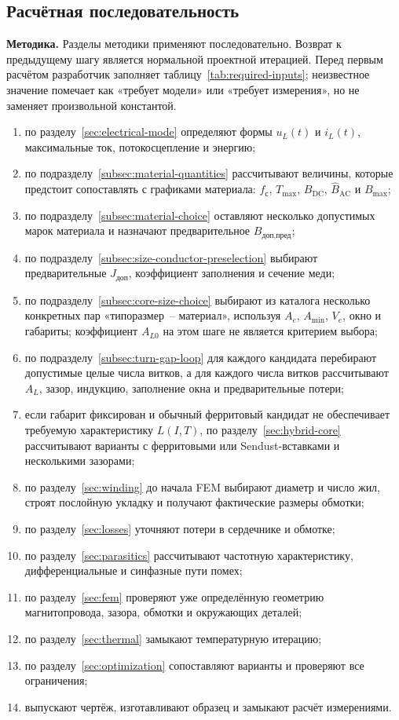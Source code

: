 \documentclass[14pt,a4paper]{extarticle}
\newcommand{\method}{\par\noindent\textbf{Методика.} }
\begin{document}
\subsection{Расчётная последовательность}

\method Разделы методики применяют последовательно. Возврат к предыдущему
шагу является нормальной проектной итерацией. Перед первым расчётом разработчик
заполняет таблицу~\ref{tab:required-inputs}; неизвестное значение помечает как
«требует модели» или «требует измерения», но не заменяет произвольной
константой.

\begin{enumerate}
\item по разделу~\ref{sec:electrical-mode} определяют формы $u_L(t)$ и
$i_L(t)$, максимальные ток, потокосцепление и энергию;
\item по подразделу~\ref{subsec:material-quantities} рассчитывают величины, которые предстоит
сопоставлять с графиками материала: $f_{\text{с}}$, $T_{\max}$,
$B_{\text{DC}}$, $\widehat B_{\text{AC}}$ и $B_{\max}$;
\item по подразделу~\ref{subsec:material-choice} оставляют несколько
допустимых марок материала и назначают предварительное
$B_{\text{доп,пред}}$;
\item по подразделу~\ref{subsec:size-conductor-preselection} выбирают
предварительные $J_{\text{доп}}$, коэффициент заполнения и сечение меди;
\item по подразделу~\ref{subsec:core-size-choice} выбирают из каталога
несколько конкретных пар
«типоразмер~-- материал», используя $A_e$, $A_{\min}$, $V_e$, окно и
габариты; коэффициент $A_{L0}$ на этом шаге не является критерием выбора;
\item по подразделу~\ref{subsec:turn-gap-loop} для каждого кандидата
перебирают допустимые целые
числа витков, а для каждого числа витков рассчитывают $A_L$, зазор,
индукцию, заполнение окна и предварительные потери;
\item если габарит фиксирован и обычный ферритовый кандидат не обеспечивает
требуемую характеристику $L(I,T)$, по разделу~\ref{sec:hybrid-core}
рассчитывают варианты с ферритовыми или Sendust-вставками и несколькими
зазорами;
\item по разделу~\ref{sec:winding} до начала FEM выбирают диаметр и число
жил, строят послойную укладку и получают фактические размеры обмотки;
\item по разделу~\ref{sec:losses} уточняют потери в сердечнике и обмотке;
\item по разделу~\ref{sec:parasitics} рассчитывают частотную характеристику,
дифференциальные и синфазные пути помех;
\item по разделу~\ref{sec:fem} проверяют уже определённую геометрию
магнитопровода, зазора, обмотки и окружающих деталей;
\item по разделу~\ref{sec:thermal} замыкают температурную итерацию;
\item по разделу~\ref{sec:optimization} сопоставляют варианты и проверяют
все ограничения;
\item выпускают чертёж, изготавливают образец и замыкают расчёт
измерениями.
\end{enumerate}
\end{document}

